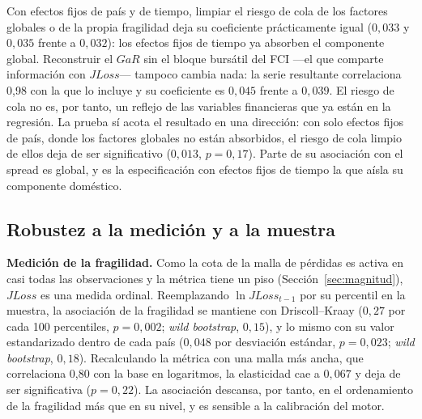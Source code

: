 Con efectos fijos de país y de tiempo, limpiar el riesgo de cola de los factores globales o de la propia fragilidad deja su coeficiente prácticamente igual ($0{,}033$ y $0{,}035$ frente a $0{,}032$): los efectos fijos de tiempo ya absorben el componente global. Reconstruir el $GaR$ sin el bloque bursátil del FCI ---el que comparte información con $JLoss$--- tampoco cambia nada: la serie resultante correlaciona 0,98 con la que lo incluye y su coeficiente es $0{,}045$ frente a $0{,}039$. El riesgo de cola no es, por tanto, un reflejo de las variables financieras que ya están en la regresión. La prueba sí acota el resultado en una dirección: con solo efectos fijos de país, donde los factores globales no están absorbidos, el riesgo de cola limpio de ellos deja de ser significativo ($0{,}013$, $p=0{,}17$). Parte de su asociación con el spread es global, y es la especificación con efectos fijos de tiempo la que aísla su componente doméstico.

\subsection{Robustez a la medición y a la muestra}
\label{sec:robustez}

\textbf{Medición de la fragilidad.} Como la cota de la malla de pérdidas es activa en casi todas las observaciones y la métrica tiene un piso (Sección~\ref{sec:magnitud}), $JLoss$ es una medida ordinal. Reemplazando $\ln JLoss_{t-1}$ por su percentil en la muestra, la asociación de la fragilidad se mantiene con Driscoll--Kraay ($0{,}27$ por cada 100 percentiles, $p=0{,}002$; \textit{wild bootstrap}, $0{,}15$), y lo mismo con su valor estandarizado dentro de cada país ($0{,}048$ por desviación estándar, $p=0{,}023$; \textit{wild bootstrap}, $0{,}18$). Recalculando la métrica con una malla más ancha, que correlaciona 0,80 con la base en logaritmos, la elasticidad cae a $0{,}067$ y deja de ser significativa ($p=0{,}22$). La asociación descansa, por tanto, en el ordenamiento de la fragilidad más que en su nivel, y es sensible a la calibración del motor.


